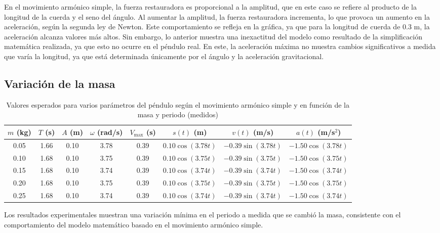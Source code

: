 \documentclass[letterpaper]{report}
\numberwithin{table}{section}
\begin{document}
En el movimiento armónico simple, la fuerza restauradora es
proporcional a la amplitud, que en este caso se refiere al producto
de la longitud de la cuerda y el seno del ángulo. Al aumentar la
amplitud, la fuerza restauradora incrementa, lo que provoca un
aumento en la aceleración, según la segunda ley de Newton. Este
comportamiento se refleja en la gráfica, ya que para la longitud de
cuerda de 0.3 m, la aceleración alcanza valores más altos. Sin
embargo, lo anterior muestra una inexactitud del modelo como
resultado de la simplificación matemática realizada, ya que esto no
ocurre en el péndulo real. En este, la aceleración máxima no muestra
cambios significativos a medida que varía la longitud, ya que está
determinada únicamente por el ángulo y la aceleración gravitacional.

\subsection{Variación de la masa}

\begin{table}[h]
  \centering
  \footnotesize
  \begin{tabular}{cccccccc}
    \toprule
    $m$ (kg) & $T$ (s) & $A$ (m) & $\omega$ (rad/s) & $V_{\max}$ (s) &
    $s(t)$ (m) & $v(t)$ (m/s) & $a(t)$ (m/s$^{2}$)\\
    \midrule
    0.05 & 1.66 & 0.10 & 3.78 & 0.39 & $0.10 \cos(3.78t)$ & $-0.39
    \sin(3.78t)$ & $-1.50\cos(3.78t)$ \\
    0.10 & 1.68 & 0.10 & 3.75 & 0.39 & $0.10 \cos(3.75t)$ & $-0.39
    \sin(3.75t)$ & $-1.50\cos(3.75t)$ \\
    0.15 & 1.68 & 0.10 & 3.74 & 0.39 & $0.10 \cos(3.74t)$ & $-0.39
    \sin(3.74t)$ & $-1.50\cos(3.74t)$ \\
    0.20 & 1.68 & 0.10 & 3.75 & 0.39 & $0.10 \cos(3.75t)$ & $-0.39
    \sin(3.75t)$ & $-1.50\cos(3.75t)$ \\
    0.25 & 1.68 & 0.10 & 3.74 & 0.39 & $0.10 \cos(3.74t)$ & $-0.39
    \sin(3.74t)$ & $-1.50\cos(3.74t)$ \\
    \bottomrule
  \end{tabular}
  \caption{Valores esperados para varios parámetros del péndulo según el
    movimiento armónico simple y en función de la masa y periodo
  (medidos)}\label{tab:masa_valores_esperados}
\end{table}

Los resultados experimentales muestran una variación mínima en el
periodo a medida que se cambió la masa, consistente con el
comportamiento del modelo matemático basado en el movimiento armónico simple.
\end{document}
